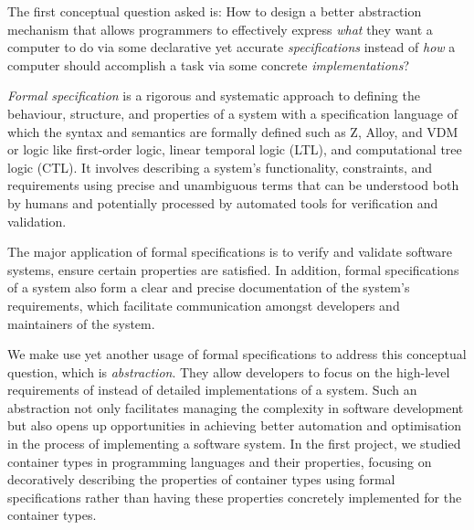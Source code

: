 
\begin{center}
\vspace{-0.7em}
\vspace{-0.3em}
\end{center}

The first conceptual question asked is: 
How to design a better abstraction mechanism that allows programmers to effectively express \emph{what} they want a computer to do via some declarative yet accurate \emph{specifications} instead of \emph{how} a computer should accomplish a task via some concrete \emph{implementations}?

\emph{Formal specification} is a rigorous and systematic approach to defining the behaviour, structure, and properties of a system with a specification language of which the syntax and semantics are formally defined such as Z, Alloy, and VDM or logic like first-order logic, linear temporal logic (LTL), and computational tree logic (CTL). It involves describing a system's functionality, constraints, and requirements using precise and unambiguous terms that can be understood both by humans and potentially processed by automated tools for verification and validation.

The major application of formal specifications is to verify and validate software systems, ensure certain properties are satisfied. In addition, formal specifications of a system also form a clear and precise documentation of the system's requirements, which facilitate communication amongst developers and maintainers of the system.

We make use yet another usage of formal specifications to address this conceptual question, which is \emph{abstraction}. They allow developers to focus on the high-level requirements of instead of detailed implementations of a system. Such an abstraction not only facilitates managing the complexity in software development but also opens up opportunities in achieving better automation and optimisation in the process of implementing a software system. In the first project, we studied container types in programming languages and their properties, focusing on decoratively describing the properties of container types using formal specifications rather than having these properties concretely implemented for the container types.

